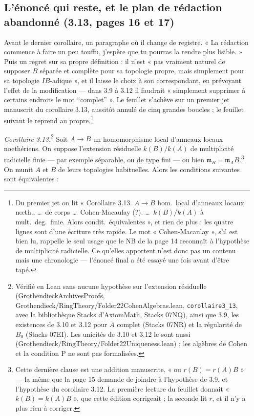 \documentclass[11pt,a4paper]{article}
\begin{document}
\subsection*{L'énoncé qui reste, et le plan de rédaction abandonné (3.13, pages 16 et 17)}

Avant le dernier corollaire, un paragraphe où il change de registre. « La
rédaction commence à faire un peu touffu, j'espère que tu pourras la rendre
plus lisible. » Puis un regret sur sa propre définition : il n'est « pas
vraiment naturel de supposer $B$ séparée et complète pour sa topologie propre,
mais simplement pour sa topologie $IB$-adique », et il laisse le choix à son
correspondant, en prévoyant l'effet de la modification — dans 3.9 à 3.12 il
faudrait « simplement supprimer à certains endroits le mot “complet” ». Le
feuillet s'achève sur un premier jet manuscrit du corollaire 3.13, aussitôt
annulé de cinq grandes boucles ; le feuillet suivant le reprend au
propre.\footnote{Du premier jet on lit « Corollaire 3.13. $A \to B$ hom.\
local d'anneaux locaux nœth., \ldots\ de corps \ldots\ Cohen-Macaulay (?).
\ldots\ $k(B)/k(A)$ à mult.\ deg.\ finie. Alors condit.\ équivalentes », et
rien de plus : les quatre lignes sont d'une écriture très rapide. Le mot
« Cohen-Macaulay », s'il est bien lu, rappelle le seul usage que le NB de la
page 14 reconnaît à l'hypothèse de multiplicité radicielle. Ce qu'elles apportent n'est donc
pas un contenu mais une chronologie — l'énoncé final a été essayé une fois
avant d'être tapé.}

\emph{Corollaire 3.13.}\footnote{Vérifié en Lean sans aucune hypothèse sur
l'extension résiduelle (GrothendieckArchivesProofs,
Grothendieck/RingTheory/Folder22CohenAlgebras.lean, \texttt{corollaire3\_13}, avec la bibliothèque Stacks d'AxiomMath,
Stacks 07NQ), ainsi que 3.9, les existences de 3.10 et 3.12 pour $A$ complet
(Stacks 07NR) et la régularité de $B_0$ (Stacks 07EI). Les unicités de 3.10 et 3.12 le
sont aussi (Grothendieck/RingTheory/Folder22Uniqueness.lean) ; les algèbres de Cohen et la
condition P ne sont pas formalisées.} Soit $A \to B$ un homomorphisme local d'anneaux locaux
noethériens. On suppose l'extension résiduelle $k(B)/k(A)$ de multiplicité
radicielle finie — par exemple séparable, ou de type fini — ou bien
$\mathfrak{m}_B = \mathfrak{m}_A B$.\footnote{Cette dernière clause est une
addition manuscrite, « ou $r(B) = r(A)B$ » — la même que la page 15 demande de
joindre à l'hypothèse de 3.9, et l'hypothèse du corollaire 3.12. La première
lecture du feuillet donnait « $k(B) = k(A)B$ », que cette édition corrigeait ;
la seconde lit $r$, et il n'y a plus rien à corriger.}
On munit $A$ et $B$ de leurs topologies habituelles. Alors les conditions
suivantes sont équivalentes :
\end{document}
